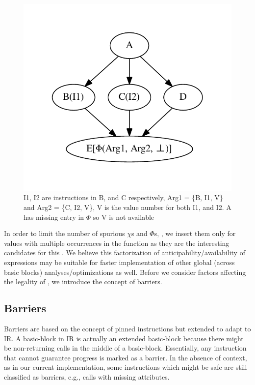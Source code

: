 \documentclass[sigplan,10pt,review,anonymous]{acmart}\settopmatter{printfolios=true,printccs=false,printacmref=false}
\begin{document}
\begin{figure}[h]
  \includegraphics[scale=0.55]{phi-example.pdf}
  \vspace*{-1.0cm}
  \caption{I1, I2 are instructions in B, and C respectively, Arg1 = \{B, I1, V\}
  and Arg2 = \{C, I2, V\}, V is the value number for both I1, and I2. A has
  missing entry in $\Phi$ so V is not available}
\label{fig:phi-intro}
\end{figure}

In order to limit the number of spurious $\chi$s and $\Phi$s,
\cite{ssapre-improv}, we insert them only for values with multiple occurrences
in the function as they are the interesting candidates for this \GCM{}. We
believe this factorization of anticipability/availability of expressions may be
suitable for faster implementation of other global (across basic blocks)
analyses/optimizations as well. Before we consider factors affecting the
legality of \GCM{}, we introduce the concept of barriers.

\subsection{Barriers}
\label{subsec:barriers}
Barriers are based on the concept of pinned instructions \cite{click1995global}
but extended to adapt to \LLVM{} IR. A basic-block in \LLVM{} IR is actually an
extended basic-block because there might be non-returning calls in the middle of
a basic-block. Essentially, any instruction that cannot guarantee progress is
marked as a barrier. In the absence of context, as in our current
implementation, some instructions which might be safe are still classified as
barriers, e.g., calls with missing attributes.
\end{document}
